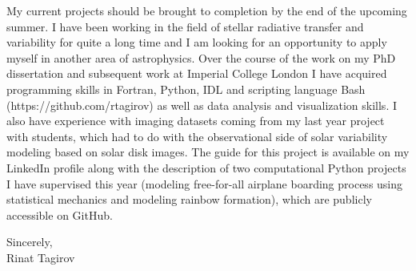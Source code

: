 \documentclass[11pt, a4paper]{awesome-cv}
\begin{document}
\begin{cvletter}
My current projects should be brought to completion by the end of the upcoming summer.
I have been working in the field of stellar radiative transfer and variability for quite a long time and I am looking
for an opportunity to apply myself in another area of astrophysics.
Over the course of the work on my PhD dissertation and subsequent work at Imperial College London I have acquired programming skills
in Fortran, Python, IDL and scripting language Bash (https://github.com/rtagirov) as well as data analysis and visualization skills.
I also have experience with imaging datasets
coming from my last year project with students, which
had to do with the observational side of solar variability modeling
based on solar disk images.
The guide for this project is available on my LinkedIn profile along with the description
of two computational Python projects I have supervised this year
(modeling free-for-all airplane boarding process using statistical mechanics and
modeling rainbow formation),
which are publicly accessible on GitHub.

Sincerely,\\
Rinat Tagirov

\end{cvletter}


\end{document}
